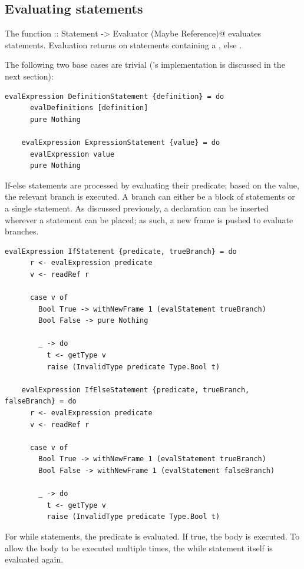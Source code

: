 \documentclass[UdineBachThesis,american,11pt]{PhdThesis}
\begin{document}
  \subsection{Evaluating statements}

  The function
  \lstinline@evalStatement :: Statement -> Evaluator (Maybe Reference)@
  evaluates statements. Evaluation returns \lstinline@Just@ on statements
  containing a \lstinline@return@, else \lstinline@Nothing@.

  The following two base cases are trivial (\lstinline@evalDefinitions@'s
  implementation is discussed in the next section):

  \begin{lstlisting}[gobble=4,basicstyle=\ttfamily\small]
    evalExpression DefinitionStatement {definition} = do
      evalDefinitions [definition]
      pure Nothing

    evalExpression ExpressionStatement {value} = do
      evalExpression value
      pure Nothing
  \end{lstlisting}

  If-else statements are processed by evaluating their predicate; based on the
  value, the relevant branch is executed. A branch can either be a block of
  statements or a single statement. As discussed previously, a declaration can
  be inserted wherever a statement can be placed; as such, a new frame is pushed
  to evaluate branches.

  \begin{lstlisting}[gobble=4,basicstyle=\ttfamily\small]
    evalExpression IfStatement {predicate, trueBranch} = do
      r <- evalExpression predicate
      v <- readRef r

      case v of
        Bool True -> withNewFrame 1 (evalStatement trueBranch)
        Bool False -> pure Nothing

        _ -> do
          t <- getType v
          raise (InvalidType predicate Type.Bool t)

    evalExpression IfElseStatement {predicate, trueBranch, falseBranch} = do
      r <- evalExpression predicate
      v <- readRef r

      case v of
        Bool True -> withNewFrame 1 (evalStatement trueBranch)
        Bool False -> withNewFrame 1 (evalStatement falseBranch)

        _ -> do
          t <- getType v
          raise (InvalidType predicate Type.Bool t)
  \end{lstlisting}

  For while statements, the predicate is evaluated. If true, the body is
  executed. To allow the body to be executed multiple times, the while statement
  itself is evaluated again.
\end{document}
